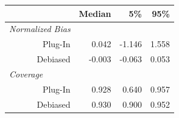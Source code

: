 
\begin{tabular}{r|rrr}
\toprule
  & Median & 5\% & 95\%\\
\midrule
\multicolumn{1}{l|}{\textit{Normalized Bias}}\\
Plug-In & 0.042 & -1.146 & 1.558\\
Debiased & -0.003 & -0.063 & 0.053\\
\midrule
\multicolumn{1}{l|}{\textit{Coverage}}\\
Plug-In & 0.928 & 0.640 & 0.957\\
Debiased & 0.930 & 0.900 & 0.952\\
\bottomrule
\end{tabular}
